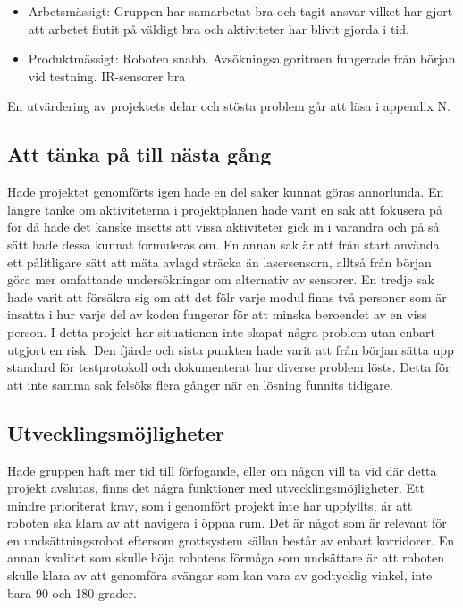\documentclass[11pt]{article}
\begin{document}
\begin{flushleft}
\begin{itemize}
\item Arbetsmässigt: Gruppen har samarbetat bra och tagit ansvar vilket har gjort att arbetet flutit på väldigt bra och aktiviteter har blivit gjorda i tid. 
\item Produktmässigt: Roboten snabb. Avsökningsalgoritmen fungerade från början vid testning. IR-sensorer bra
\end{itemize}

En utvärdering av projektets delar och stösta problem går att läsa i appendix N.

\subsection{Att tänka på till nästa gång}
Hade projektet genomförts igen hade en del saker kunnat göras annorlunda. En längre tanke om aktiviteterna i projektplanen hade varit en sak att fokusera på för då hade det kanske insetts att vissa aktiviteter gick in i varandra och på så sätt hade dessa kunnat formuleras om. En annan sak är att från start använda ett pålitligare sätt att mäta avlagd sträcka än lasersensorn, alltså från början göra mer omfattande undersökningar om alternativ av sensorer. En tredje sak hade varit att försäkra sig om att det fölr varje modul finns två personer som är insatta i hur varje del av koden fungerar för att minska beroendet av en viss person. I detta projekt har situationen inte skapat några problem utan enbart utgjort en risk. Den fjärde och sista punkten hade varit att från början sätta upp standard för testprotokoll och dokumenterat hur diverse problem lösts. Detta för att inte samma sak felsöks flera gånger när en lösning funnits tidigare. 

\subsection{Utvecklingsmöjligheter}
Hade gruppen haft mer tid till förfogande, eller om någon vill ta vid där detta projekt avslutas, finns det några funktioner med utvecklingsmöjligheter. Ett mindre prioriterat krav, som i genomfört projekt inte har uppfyllts, är att roboten ska klara av att navigera i öppna rum. Det är något som är relevant för en undsättningsrobot eftersom grottsystem sällan består av enbart korridorer. En annan kvalitet som skulle höja robotens förmåga som undsättare är att roboten skulle klara av att genomföra svängar som kan vara av godtycklig vinkel, inte bara 90 och 180 grader. 


\end{flushleft}
\end{document}
